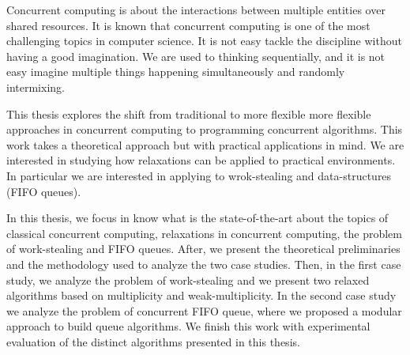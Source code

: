 \begin{resumen}

Concurrent computing is about the interactions between multiple entities over shared resources. It is known that concurrent computing is one of the most challenging topics in computer science. It is not easy tackle the discipline without having a good imagination.  We are used to thinking sequentially, and it is not easy imagine multiple things happening simultaneously and randomly intermixing.

This thesis explores the shift from traditional to more flexible more flexible approaches in concurrent computing to programming concurrent algorithms. This work takes a theoretical approach but with practical applications in mind. We are interested in studying how relaxations can be applied to practical environments. In particular we are interested in applying to wrok-stealing and data-structures (FIFO queues).

In this thesis, we focus in know what is the state-of-the-art about the topics of classical concurrent computing, relaxations in concurrent computing, the problem of work-stealing and FIFO queues. After, we present the theoretical preliminaries and the methodology used to analyze the two case studies. Then, in the first case study, we analyze the problem of work-stealing and we present two relaxed algorithms based on multiplicity and weak-multiplicity. In the second case study we analyze the problem of concurrent FIFO queue, where we proposed a modular approach to build queue algorithms. We finish this work with experimental evaluation of the distinct algorithms presented in this thesis.


\end{resumen}
